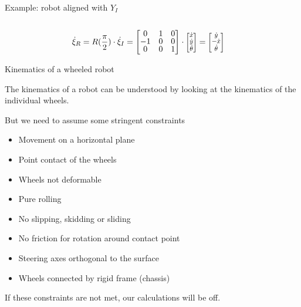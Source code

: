 \documentclass[compress]{beamer}
\newcommand{\colvec}[2][.8]{%
  \scalebox{#1}{%
    \renewcommand{\arraystretch}{.8}%
    $\begin{bmatrix}#2\end{bmatrix}$%
  }
}
\begin{document}
\begin{frame}{Example: robot aligned with $Y_I$}
\begin{columns}
\begin{column}{0.4\linewidth}
{
            }

        \end{column}
    \end{columns}


    \begin{align*}
        \dot\xi_R &= R(\frac{\pi}{2})\cdot \dot\xi_I = \begin{bmatrix} 0 & 1 & 0 \\
                                                                      -1 & 0 & 0 \\
                                                                       0 & 0 & 1 \end{bmatrix} \cdot \colvec{\dot{x} \\ \dot{y} \\ \dot\theta} =  \colvec{\dot{y} \\ -\dot{x} \\ \dot\theta} 
    \end{align*}



\end{frame}

\begin{frame}{Kinematics of a wheeled robot}

The kinematics of a robot can be understood by looking at the kinematics
of the individual wheels.

But we need to assume some stringent constraints

\begin{itemize}
    \item Movement on a horizontal plane
    \item Point contact of the wheels
    \item Wheels not deformable
    \item Pure rolling
    \item No slipping, skidding or sliding
    \item No friction for rotation around contact point
    \item Steering axes orthogonal to the surface
    \item Wheels connected by rigid frame (chassis)
\end{itemize}

If these constraints are not met, our calculations will be off.

\end{frame}
\end{document}
